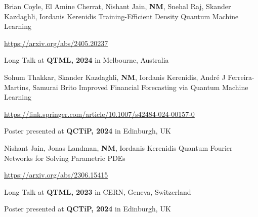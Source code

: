 

\begin{cventries}

  \cventry
    {Brian Coyle, El Amine Cherrat, Nishant Jain, \textbf{NM}, Snehal Raj, Skander Kazdaghli, Iordanis Kerenidis} %
    {Training-Efficient Density Quantum Machine Learning} %
    {} %
    {}
    {
      \begin{cvitems} %
        \item {\href{https://arxiv.org/abs/2405.20237}{https://arxiv.org/abs/2405.20237}}
        \item {Long Talk at \textbf{QTML, 2024} in Melbourne, Australia}
      \end{cvitems}
    }

  \cventry
    {Sohum Thakkar, Skander Kazdaghli, \textbf{NM}, Iordanis Kerenidis, André J Ferreira-Martins, Samurai Brito} %
    {Improved Financial Forecasting via Quantum Machine Learning} %
    {} %
    {}
    {
      \begin{cvitems} %
        \item {\href{https://link.springer.com/article/10.1007/s42484-024-00157-0}{https://link.springer.com/article/10.1007/s42484-024-00157-0}}
        \item {Poster presented at \textbf{QCTiP, 2024} in Edinburgh, UK}
      \end{cvitems}
    }

  \cventry
    {Nishant Jain, Jonas Landman, \textbf{NM}, Iordanis Kerenidis} %
    {Quantum Fourier Networks for Solving Parametric PDEs} %
    {} %
    {}
    {
      \begin{cvitems} %
        \item {\href{https://arxiv.org/abs/2306.15415}{https://arxiv.org/abs/2306.15415}}
        \item {Long Talk at \textbf{QTML, 2023} in CERN, Geneva, Switzerland}
        \item {Poster presented at \textbf{QCTiP, 2024} in Edinburgh, UK}
      \end{cvitems}
    }


\end{cventries}
